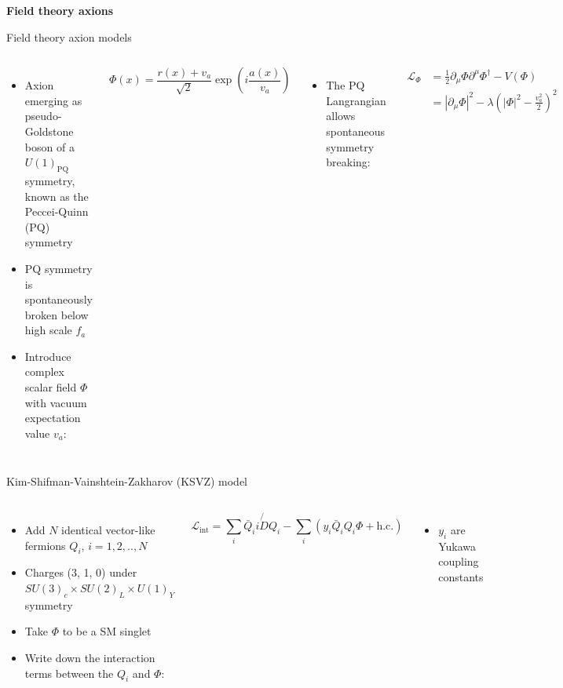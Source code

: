 \documentclass[aspectratio=1610, 9pt]{beamer}
\begin{document}
\begin{frame}[noframenumbering]
  \centering
  \Huge \textbf{\textcolor{tugreen}{Field theory axions}}
\end{frame}

\begin{frame}{Field theory axion models}
  \begin{columns}
    \column{\textwidth}
    \begin{itemize}
      \item Axion emerging as pseudo-Goldstone boson of a $U(1)_{\text{PQ}}$ symmetry, known as the Peccei-Quinn (PQ) symmetry
      \item PQ symmetry is spontaneously broken below high scale $f_a$
      \item Introduce complex scalar field $\Phi$ with vacuum expectation value $v_a$:
    \end{itemize}
    \begin{equation*}
      \Phi(x) = \frac{r(x)+v_a}{\sqrt{2}}\exp \left(i\frac{a(x)}{v_a}\right) 
    \end{equation*}
    \begin{itemize}
    \item The PQ Langrangian allows spontaneous symmetry breaking:
    \end{itemize}
    \begin{align*}
      \mathcal{L}_{\Phi} &= \frac{1}{2} \partial_\mu \Phi \partial^\mu \Phi^\dagger - V(\Phi) \\
      & =  {| \partial_\mu \Phi |}^2 - \lambda \left( |\Phi|^2 - \frac{v_a^2}{2} \right)^2
    \end{align*}
    \begin{itemize}
      \item Axion is massless
      \end{itemize}
  \end{columns} 
\end{frame}

\begin{frame}{Kim-Shifman-Vainshtein-Zakharov (KSVZ) model}
  \begin{columns}
    \column{\textwidth}
    \begin{itemize}
      \item Add $N$ identical vector-like fermions $Q_i$, $i=1,2,..,N$
      \item Charges (3, 1, 0) under $SU(3)_c × SU(2)_L × U(1)_Y$ symmetry
      \item Take $\Phi$ to be a SM singlet
      \item Write down the interaction terms between the $Q_i$ and $\Phi$:
    \end{itemize}
    \begin{equation*}
      \mathcal{L}_{\text{int}} = \sum_i \bar{Q}_i i \not{D} Q_i - \sum_i \left( y_i \bar{Q}_i Q_i \Phi + \text{h.c.} \right)
    \end{equation*}
    \begin{itemize}
      \item $y_i$ are Yukawa coupling constants
    \end{itemize}
  \end{columns} 
\end{frame}
\end{document}

